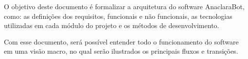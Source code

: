 \par O objetivo deste documento é formalizar a arquitetura do software AnaclaraBot, como: as definições dos requisitos, funcionais e não funcionais, as tecnologias utilizadas em cada módulo do projeto e os métodos de desenvolvimento.
\\
\par Com esse documento, será possível entender todo o funcionamento do software em uma visão macro, no qual serão ilustrados os principais fluxos e transições. 